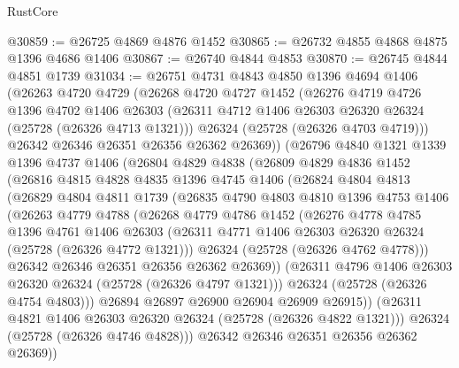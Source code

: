 \begin{lexlean}{RustCore}
\begin{coremodule}
@30859 := @26725 @4869 @4876 @1452
@30865 := @26732 @4855 @4868 @4875 @1396 @4686 @1406
@30867 := @26740 @4844 @4853
@30870 := @26745 @4844 @4851 @1739
@31034 := @26751
    @4731
    @4843
    @4850
    @1396
    @4694
    @1406
    (@26263
      @4720
      @4729
      (@26268
        @4720
        @4727
        @1452
        (@26276
          @4719
          @4726
          @1396
          @4702
          @1406
          @26303
          (@26311 @4712 @1406 @26303 @26320 @26324 (@25728 (@26326 @4713 @1321)))
          @26324
          (@25728 (@26326 @4703 @4719)))
        @26342
        @26346
        @26351
        @26356
        @26362
        @26369))
    (@26796
      @4840
      @1321
      @1339
      @1396
      @4737
      @1406
      (@26804
        @4829
        @4838
        (@26809
          @4829
          @4836
          @1452
          (@26816
            @4815
            @4828
            @4835
            @1396
            @4745
            @1406
            (@26824
              @4804
              @4813
              (@26829
                @4804
                @4811
                @1739
                (@26835
                  @4790
                  @4803
                  @4810
                  @1396
                  @4753
                  @1406
                  (@26263
                    @4779
                    @4788
                    (@26268
                      @4779
                      @4786
                      @1452
                      (@26276
                        @4778
                        @4785
                        @1396
                        @4761
                        @1406
                        @26303
                        (@26311 @4771 @1406 @26303 @26320 @26324 (@25728 (@26326 @4772 @1321)))
                        @26324
                        (@25728 (@26326 @4762 @4778)))
                      @26342
                      @26346
                      @26351
                      @26356
                      @26362
                      @26369))
                  (@26311 @4796 @1406 @26303 @26320 @26324 (@25728 (@26326 @4797 @1321)))
                  @26324
                  (@25728 (@26326 @4754 @4803)))
                @26894
                @26897
                @26900
                @26904
                @26909
                @26915))
            (@26311 @4821 @1406 @26303 @26320 @26324 (@25728 (@26326 @4822 @1321)))
            @26324
            (@25728 (@26326 @4746 @4828)))
          @26342
          @26346
          @26351
          @26356
          @26362
          @26369))

\end{coremodule}
\end{lexlean}
